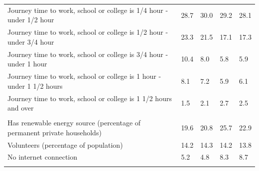 \documentclass{article}
\begin{document}
\begin{table}[h]
\begin{tabular}{KTTTT}
Journey time to work, school or college is 1/4 hour - under 1/2 hour & 28.7& 30.0& 29.2& 28.1\\
Journey time to work, school or college is 1/2 hour - under 3/4 hour & 23.3& 21.5& 17.1& 17.3\\
Journey time to work, school or college is 3/4 hour - under 1 hour & 10.4&  8.0&  5.8&  5.9\\
Journey time to work, school or college is 1 hour - under 1 1/2 hours & 8.1& 7.2& 5.9& 6.1\\
Journey time to work, school or college is 1 1/2 hours and over & 1.5& 2.1& 2.7& 2.5\\
\hline
    \\ 
    \hline
Has renewable energy source (percentage of permanent private households) & 19.6& 20.8& 25.7& 22.9\\
    \hline
Volunteers (percentage of population) & 14.2& 14.3& 14.2& 13.8\\
    \hline
No internet connection& 5.2& 4.8& 8.3& 8.7\\
\hline
\end{tabular}
\end{table}
\end{document}
